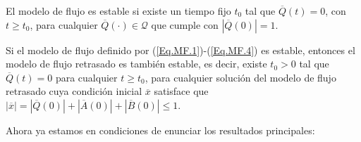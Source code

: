 \begin{Def}
El modelo de flujo es estable si existe un tiempo fijo $t_{0}$ tal
que $\overline{Q}\left(t\right)=0$, con $t\geq t_{0}$, para
cualquier $\overline{Q}\left(\cdot\right)\in\mathcal{Q}$ que
cumple con $|\overline{Q}\left(0\right)|=1$.
\end{Def}

\begin{Lemma}
Si el modelo de flujo definido por (\ref{Eq.MF.1})-(\ref{Eq.MF.4})
es estable, entonces el modelo de flujo retrasado es tambi\'en
estable, es decir, existe $t_{0}>0$ tal que
$\overline{Q}\left(t\right)=0$ para cualquier $t\geq t_{0}$, para
cualquier soluci\'on del modelo de flujo retrasado cuya
condici\'on inicial $\overline{x}$ satisface que
$|\overline{x}|=|\overline{Q}\left(0\right)|+|\overline{A}\left(0\right)|+|\overline{B}\left(0\right)|\leq1$.
\end{Lemma}


Ahora ya estamos en condiciones de enunciar los resultados principales:



